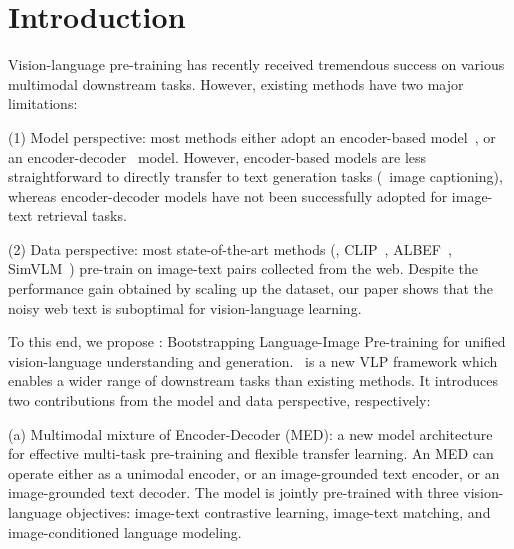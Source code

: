 \vspace{-3ex}
\section{Introduction}
Vision-language pre-training has recently received tremendous success on various multimodal downstream tasks.
However, existing methods have two major limitations:

(1) Model perspective: most methods either adopt an encoder-based model~\cite{clip,ALBEF}, or an encoder-decoder~\cite{VL_T5,simvlm} model.
However, encoder-based models are less straightforward to directly transfer to text generation tasks (\eg~image captioning), whereas encoder-decoder models have not been successfully adopted for image-text retrieval tasks.

(2) Data perspective: most state-of-the-art methods (\eg, CLIP~\cite{clip}, ALBEF~\cite{ALBEF}, SimVLM~\cite{simvlm}) pre-train on image-text pairs collected from the web. 
Despite the performance gain obtained by scaling up the dataset,
our paper shows that the noisy web text is suboptimal for vision-language learning.


To this end, we propose \name: Bootstrapping Language-Image Pre-training for unified vision-language understanding and generation.
\name~is a new VLP framework which enables a wider range of downstream tasks than existing methods.
It introduces two contributions from the model and data perspective, respectively:

(a) Multimodal mixture of Encoder-Decoder (MED):
a new model architecture for effective multi-task pre-training and flexible transfer learning.
An MED can operate either as a unimodal encoder, or an image-grounded text encoder, or an image-grounded text decoder.
The model is jointly pre-trained with three vision-language objectives: image-text contrastive learning, image-text matching, and image-conditioned language modeling.



